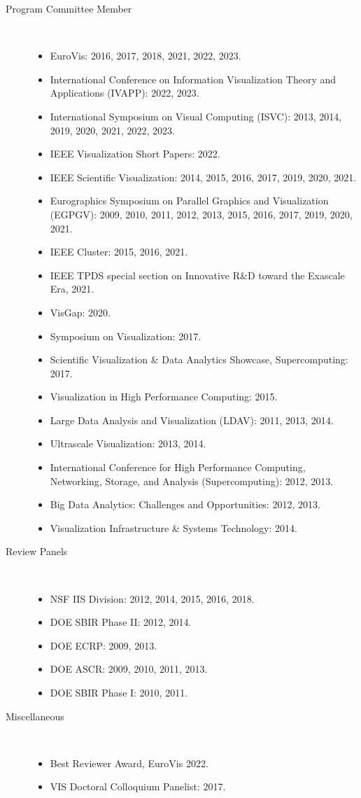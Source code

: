 \documentclass{article}
\begin{document}
\begin{description}
\begin{itemize}
  \end{itemize}
\item[Program Committee Member]~
  \begin{itemize}
  \item
    EuroVis: 2016, 2017, 2018, 2021, 2022, 2023.
  \item
    International Conference on Information Visualization Theory and Applications (IVAPP): 2022, 2023. 
  \item
    International Symposium on Visual Computing (ISVC): 2013, 2014, 2019, 2020, 2021, 2022, 2023.
  \item
    IEEE Visualization Short Papers: 2022.
  \item
    IEEE Scientific Visualization: 2014, 2015, 2016, 2017, 2019, 2020, 2021.
  \item
    Eurographics Symposium on Parallel Graphics and Visualization (EGPGV): 2009, 2010, 2011, 2012, 2013, 2015, 2016, 2017, 2019, 2020, 2021.
  \item
    IEEE Cluster: 2015, 2016, 2021.
  \item
    IEEE TPDS special section on Innovative R\&D toward the Exascale Era, 2021.
  \item
    VisGap: 2020.
  \item
    Symposium on Visualization: 2017.
  \item
    Scientific Visualization \& Data Analytics Showcase, Supercomputing: 2017.
  \item
    Visualization in High Performance Computing: 2015.
  \item
    Large Data Analysis and Visualization (LDAV): 2011, 2013, 2014.
  \item
    Ultrascale Visualization: 2013, 2014.
  \item
    International Conference for High Performance Computing, Networking, Storage, and Analysis (Supercomputing): 2012, 2013.
  \item
    Big Data Analytics: Challenges and Opportunities: 2012, 2013.
  \item
    Visualization Infrastructure \& Systems Technology: 2014.
  \end{itemize}
\item[Review Panels]~
  \begin{itemize}
  \item
    NSF IIS Division: 2012, 2014, 2015, 2016, 2018.
  \item
    DOE SBIR Phase II: 2012, 2014.
  \item
    DOE ECRP: 2009, 2013.
  \item
    DOE ASCR: 2009, 2010, 2011, 2013.
  \item
    DOE SBIR Phase I: 2010, 2011.
  \end{itemize}
\item[Miscellaneous]~
  \begin{itemize}
  \item
    Best Reviewer Award, EuroVis 2022.
  \item
    VIS Doctoral Colloquium Panelist: 2017.
  \end{itemize}
\end{description}
\end{document}
